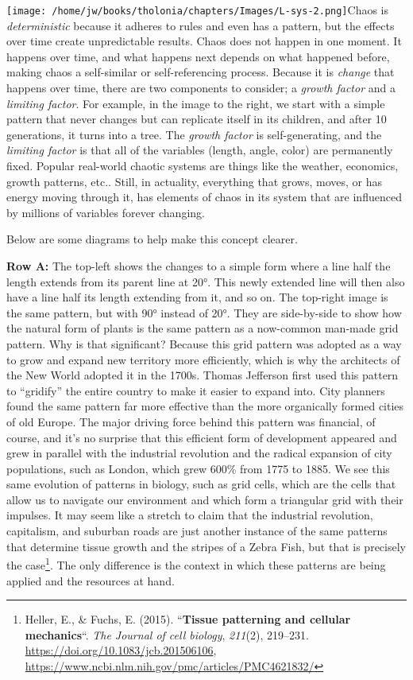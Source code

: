 \documentclass[
]{article}
\begin{document}
\texttt{[image: /home/jw/books/tholonia/chapters/Images/L-sys-2.png]}Chaos
is \emph{deterministic} because it adheres to rules and even has a
pattern, but the effects over time create unpredictable results. Chaos
does not happen in one moment. It happens over time, and what happens
next depends on what happened before, making chaos a self-similar or
self-referencing process. Because it is \emph{change} that happens over
time, there are two components to consider; a \emph{growth factor} and a
\emph{limiting factor}. For example, in the image to the right, we start
with a simple pattern that never changes but can replicate itself in its
children, and after 10 generations, it turns into a tree. The
\emph{growth factor} is self-generating, and the \emph{limiting factor}
is that all of the variables (length, angle, color) are permanently
fixed. Popular real-world chaotic systems are things like the weather,
economics, growth patterns, etc.. Still, in actuality, everything that
grows, moves, or has energy moving through it, has elements of chaos in
its system that are influenced by millions of variables forever
changing.

Below are some diagrams to help make this concept clearer.

\textbf{Row A:} The top-left shows the changes to a simple form where a
line half the length extends from its parent line at 20°. This newly
extended line will then also have a line half its length extending from
it, and so on. The top-right image is the same pattern, but with 90°
instead of 20°. They are side-by-side to show how the natural form of
plants is the same pattern as a now-common man-made grid pattern. Why is
that significant? Because this grid pattern was adopted as a way to grow
and expand new territory more efficiently, which is why the architects
of the New World adopted it in the 1700s. Thomas Jefferson first used
this pattern to ``gridify'' the entire country to make it easier to
expand into. City planners found the same pattern far more effective
than the more organically formed cities of old Europe. The major driving
force behind this pattern was financial, of course, and it's no surprise
that this efficient form of development appeared and grew in parallel
with the industrial revolution and the radical expansion of city
populations, such as London, which grew 600\% from 1775 to 1885. We see
this same evolution of patterns in biology, such as grid cells, which
are the cells that allow us to navigate our environment and which form a
triangular grid with their impulses. It may seem like a stretch to claim
that the industrial revolution, capitalism, and suburban roads are just
another instance of the same patterns that determine tissue growth and
the stripes of a Zebra Fish, but that is precisely the case\footnote{Heller,
  E., \& Fuchs, E. (2015). ``\textbf{Tissue patterning and cellular
  mechanics}``. \emph{The Journal of cell biology}, \emph{211}(2),
  219--231. \url{https://doi.org/10.1083/jcb.201506106},
  \url{https://www.ncbi.nlm.nih.gov/pmc/articles/PMC4621832/}}. The only
difference is the context in which these patterns are being applied and
the resources at hand.
\end{document}
